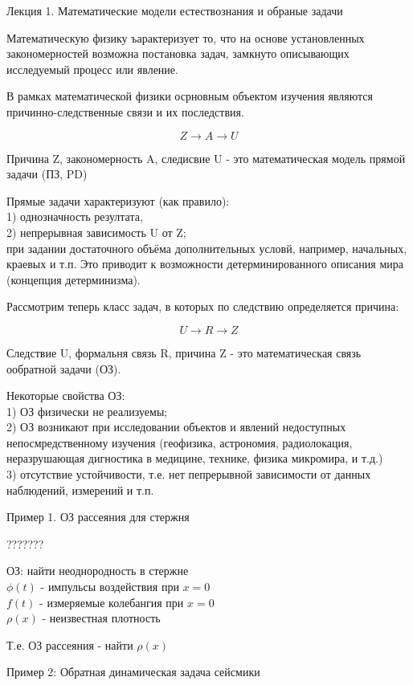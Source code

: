 \documentclass{article}
\begin{document}
\centerline{\sc Лекция 1. Математические модели естествознания и обраные задачи}

Математическую физику ъарактеризует то, что на основе установленных закономерностей возможна постановка задач, замкнуто описывающих исследуемый процесс или явление.

В рамках математической физики осрновным объектом изучения являются причинно-следственные связи и их последствия.

$$ Z \rightarrow {A} \rightarrow U $$

Причина Z, закономерность A, следисвие U - это математическая модель прямой задачи (ПЗ, PD)

Прямые задачи характеризуют (как правило):\\
1) однозначность резултата,\\
2) непрерывная зависимость U от Z;\\
при задании достаточного объёма дополнительных условй, например, начальных, краевых и т.п. Это приводит к возможности детерминированного описания мира (концепция детерминизма).

Рассмотрим теперь класс задач, в которых по следствию определяется причина:

$$ U \rightarrow {R} \rightarrow Z $$

Следствие U, формальня связь R, причина Z - это математическая связь ообратной задачи (ОЗ).

Некоторые свойства ОЗ:\\
1) ОЗ физически не реализуемы;\\
2) ОЗ возникают при исследовании объектов и явлений недоступных непосмредственному изучения (геофизика, астрономия, радиолокация, неразрушающая дигностика в медицине, технике, физика микромира, и т.д.)\\
3) отсутствие устойчивости, т.е. нет пепрерывной зависимости от данных наблюдений, измерений и т.п.

Пример 1. ОЗ рассеяния для стержня

???????

ОЗ: найти неоднородность в стержне\\
$\phi (t)$ - импульсы воздействия при $x = 0$\\
$f(t)$ - измеряемые колебангия при $x = 0$\\
$\rho(x)$ - неизвестная плотность

Т.е. ОЗ рассеяния - найти $\rho(x)$

Пример 2: Обратная динамическая задача сейсмики
\end{document}
